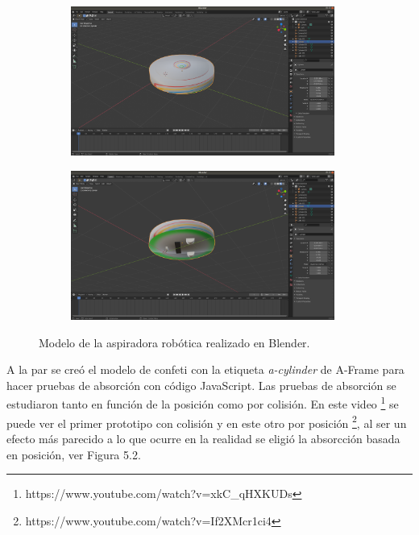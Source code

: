  \begin{figure}[H]
  \begin{subfigure}[b]{0.5\textwidth}
  \centering
    \includegraphics[width=0.95\textwidth, height=0.7\textwidth]{chapters/images/roombablender.png}
    \caption{}
    \label{fig:f1}
  \end{subfigure}
  \hfill
  \begin{subfigure}[b]{0.5\textwidth}
  \centering
    \includegraphics[width=0.95\textwidth, height=0.7\textwidth]{chapters/images/roombablender2.png}
	\caption{}    
    \label{fig:f2}
 
  \end{subfigure}
  \caption{Modelo de la aspiradora robótica  realizado en Blender.}
\end{figure}

A la par se creó el modelo de confeti con la etiqueta \textit{a-cylinder} de A-Frame para hacer pruebas de absorción con código JavaScript.
Las pruebas de absorción se estudiaron tanto en función de la posición como por colisión. En este video \footnote{https://www.youtube.com/watch?v=xkC\_qHXKUDs} se puede ver el primer prototipo con colisión y en este otro  por posición \footnote{https://www.youtube.com/watch?v=If2XMcr1ci4}, al ser un efecto más parecido a lo que ocurre en la realidad se eligió la absorcción basada en posición, ver Figura 5.2.


